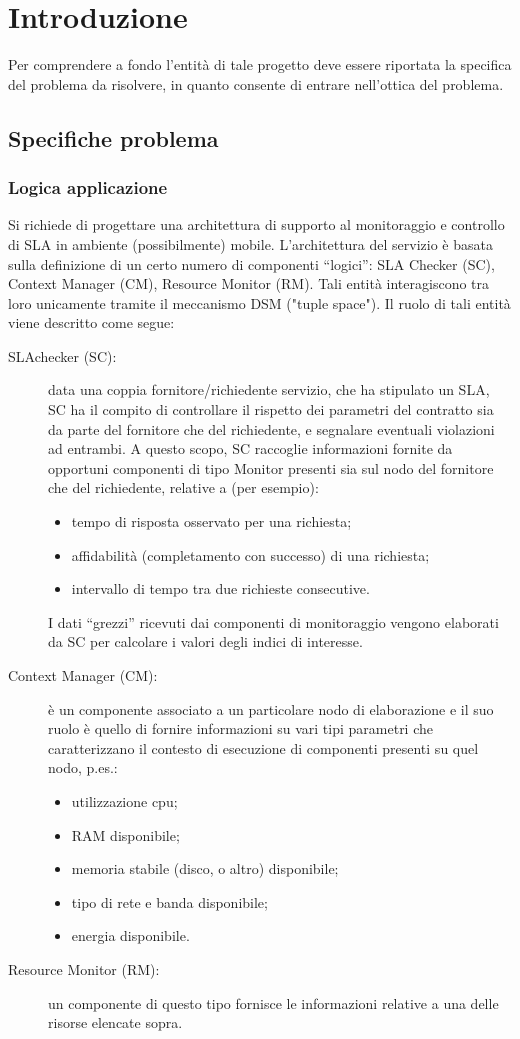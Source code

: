 \chapter{Introduzione}\label{cap:introduzione}
Per comprendere a fondo l'entità di tale progetto deve essere riportata la specifica del problema da risolvere, in quanto consente di entrare nell'ottica del problema.
\section{Specifiche problema}
\subsection{Logica applicazione}
Si richiede di progettare una architettura di supporto al monitoraggio e controllo di SLA in ambiente (possibilmente) mobile. L’architettura del servizio è basata sulla definizione di un certo numero di componenti “logici”: SLA Checker (SC), Context Manager (CM), Resource Monitor (RM). Tali entità interagiscono tra loro unicamente tramite il meccanismo DSM ("tuple space"). Il ruolo di tali entità viene descritto come segue:
\begin{description}
\item[SLAchecker (SC):] data una coppia fornitore/richiedente servizio, che ha stipulato un SLA, SC ha il compito di controllare il rispetto dei parametri del contratto sia da parte del fornitore che del richiedente, e segnalare eventuali violazioni ad entrambi. A questo scopo, SC raccoglie informazioni fornite da opportuni componenti di tipo Monitor presenti sia sul nodo del fornitore che del richiedente, relative a (per esempio):
\begin{itemize}
\item tempo di risposta osservato per una richiesta;
\item affidabilità (completamento con successo) di una richiesta;
\item intervallo di tempo tra due richieste consecutive.
\end{itemize}
I dati “grezzi” ricevuti dai componenti di monitoraggio vengono elaborati da SC per calcolare i valori degli indici di interesse.
\item[Context Manager (CM):] è un componente associato a un particolare nodo di elaborazione e il suo ruolo è quello di fornire informazioni su vari tipi parametri che caratterizzano il contesto di esecuzione di componenti presenti su quel nodo, p.es.:
\begin{itemize}
\item utilizzazione cpu;
\item RAM disponibile;
\item memoria stabile (disco, o altro) disponibile;
\item tipo di rete e banda disponibile;
\item energia disponibile.
\end{itemize}
\item[Resource Monitor (RM):] un componente di questo tipo fornisce le informazioni relative a una delle risorse elencate sopra.
\end{description}

